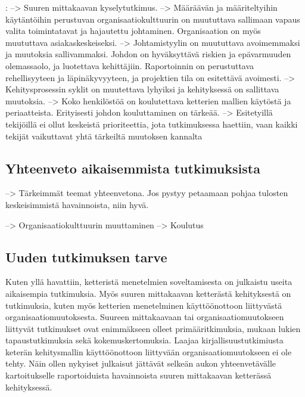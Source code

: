 \citep{Misra2009}:
--> Suuren mittakaavan kyselytutkimus. \newline
--> Määräävän ja määriteltyihin käytäntöihin perustuvan organisaatiokulttuurin
on muututtava sallimaan vapaus valita toimintatavat ja hajautettu johtaminen.
Organisaation on myös muututtava asiakaskeskeiseksi. \newline
--> Johtamistyylin on muututtava avoimemmaksi ja muutoksia sallivammaksi. Johdon
on hyväksyttävä riskien ja epävarmuuden olemassaolo, ja luotettava kehittäjiin.
Raportoinnin on perustuttava rehellisyyteen ja läpinäkyvyyteen, ja projektien
tila on esitettävä avoimesti. \newline 
--> Kehitysprosessin syklit on muutettava lyhyiksi ja kehityksessä on sallittava
muutoksia. \newline
--> Koko henkilöstöä on koulutettava ketterien mallien käytöstä ja periaatteista.
Erityisesti johdon kouluttaminen on tärkeää. \newline
--> Esitetyillä tekijöillä ei ollut keskeistä prioriteettia, jota tutkimuksessa
haettiin, vaan kaikki tekijät vaikuttavat yhtä tärkeiltä muutoksen kannalta

\subsection{Yhteenveto aikaisemmista tutkimuksista}

--> Tärkeimmät teemat yhteenvetona. Jos pystyy petaamaan pohjaa tulosten
keskeisimmistä havainnoista, niin hyvä.

--> Organisaatiokulttuurin muuttaminen \newline
--> Koulutus

\subsection{Uuden tutkimuksen tarve}
Kuten yllä havattiin, ketteristä menetelmien soveltamisesta on julkaistu useita
aikaisempia tutkimuksia. Myös suuren mittakaavan ketterästä kehityksestä on
tutkimuksia, kuten myös ketterien menetelminen käyttöönottoon liittyvästä
organisaatiomuutoksesta. Suureen mittakaavaan tai organisaatiomuutokseen
liittyvät tutkimukset ovat enimmäkseen olleet primääritkimuksia, mukaan lukien
tapaustutkimuksia sekä kokemuskertomuksia. Laajaa kirjallisuustutkimiusta
keterän kehitysmallin käyttöönottoon liittyvään organisaatiomuutokseen ei ole
tehty. Näin ollen nykyiset julkaisut jättävät selkeän aukon yhteenvetävälle
kartoitukselle raportoiduista havainnoista suuren mittakaavan ketterässä
kehityksessä.

